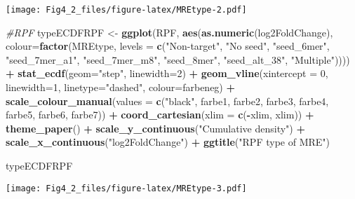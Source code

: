 \documentclass[
]{article}
\newenvironment{Shaded}{\begin{snugshade}}{\end{snugshade}}
\newcommand{\AttributeTok}[1]{\textcolor[rgb]{0.13,0.29,0.53}{#1}}
\newcommand{\CommentTok}[1]{\textcolor[rgb]{0.56,0.35,0.01}{\textit{#1}}}
\newcommand{\DecValTok}[1]{\textcolor[rgb]{0.00,0.00,0.81}{#1}}
\newcommand{\FunctionTok}[1]{\textcolor[rgb]{0.13,0.29,0.53}{\textbf{#1}}}
\newcommand{\NormalTok}[1]{#1}
\newcommand{\OtherTok}[1]{\textcolor[rgb]{0.56,0.35,0.01}{#1}}
\newcommand{\SpecialCharTok}[1]{\textcolor[rgb]{0.81,0.36,0.00}{\textbf{#1}}}
\newcommand{\StringTok}[1]{\textcolor[rgb]{0.31,0.60,0.02}{#1}}
\begin{document}
\texttt{[image: Fig4\_2\_files/figure-latex/MREtype-2.pdf]}

\begin{Shaded}
\begin{Highlighting}[]
\CommentTok{\#RPF}
\NormalTok{typeECDFRPF }\OtherTok{\textless{}{-}} \FunctionTok{ggplot}\NormalTok{(RPF, }\FunctionTok{aes}\NormalTok{(}\FunctionTok{as.numeric}\NormalTok{(log2FoldChange), }
                              \AttributeTok{colour=}\FunctionTok{factor}\NormalTok{(MREtype, }\AttributeTok{levels =} \FunctionTok{c}\NormalTok{(}\StringTok{"Non{-}target"}\NormalTok{, }\StringTok{"No seed"}\NormalTok{, }\StringTok{"seed\_6mer"}\NormalTok{, }\StringTok{"seed\_7mer\_a1"}\NormalTok{, }\StringTok{"seed\_7mer\_m8"}\NormalTok{, }\StringTok{"seed\_8mer"}\NormalTok{, }\StringTok{"seed\_alt\_38"}\NormalTok{, }\StringTok{"Multiple"}\NormalTok{)))) }\SpecialCharTok{+} 
  \FunctionTok{stat\_ecdf}\NormalTok{(}\AttributeTok{geom=}\StringTok{"step"}\NormalTok{, }\AttributeTok{linewidth=}\DecValTok{2}\NormalTok{) }\SpecialCharTok{+}
  \FunctionTok{geom\_vline}\NormalTok{(}\AttributeTok{xintercept =} \DecValTok{0}\NormalTok{, }\AttributeTok{linewidth=}\DecValTok{1}\NormalTok{, }\AttributeTok{linetype=}\StringTok{"dashed"}\NormalTok{, }\AttributeTok{colour=}\NormalTok{farbeneg) }\SpecialCharTok{+}
  \FunctionTok{scale\_colour\_manual}\NormalTok{(}\AttributeTok{values =} \FunctionTok{c}\NormalTok{(}\StringTok{"black"}\NormalTok{, farbe1, farbe2, farbe3, farbe4, farbe5, farbe6, farbe7)) }\SpecialCharTok{+}
  \FunctionTok{coord\_cartesian}\NormalTok{(}\AttributeTok{xlim =} \FunctionTok{c}\NormalTok{(}\SpecialCharTok{{-}}\NormalTok{xlim, xlim)) }\SpecialCharTok{+} 
  \FunctionTok{theme\_paper}\NormalTok{() }\SpecialCharTok{+}
  \FunctionTok{scale\_y\_continuous}\NormalTok{(}\StringTok{"Cumulative density"}\NormalTok{) }\SpecialCharTok{+} \FunctionTok{scale\_x\_continuous}\NormalTok{(}\StringTok{"log2FoldChange"}\NormalTok{) }\SpecialCharTok{+}
  \FunctionTok{ggtitle}\NormalTok{(}\StringTok{"RPF type of MRE"}\NormalTok{)}

\NormalTok{typeECDFRPF}
\end{Highlighting}
\end{Shaded}

\texttt{[image: Fig4\_2\_files/figure-latex/MREtype-3.pdf]}
\end{document}
